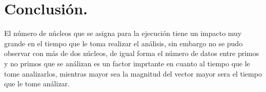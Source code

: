 \documentclass{article}
\begin{document}
  \section{Conclusi\'{o}n.}\label{con}
El n\'umero de n\'ucleos que se asigna para la ejecuci\'on tiene un impacto muy grande en el tiempo que le toma realizar el an\'alisis, sin embargo no se pudo observar con m\'as de dos n\'ucleos, de igual forma el n\'umero de datos entre primos y no primos que se an\'alizan es un factor imprtante en cuanto al tiempo que le tome analizarlos, mientras mayor sea la magnitud del vector mayor sera el tiempo que le tome an\'alizar.
  
  
\end{document}

